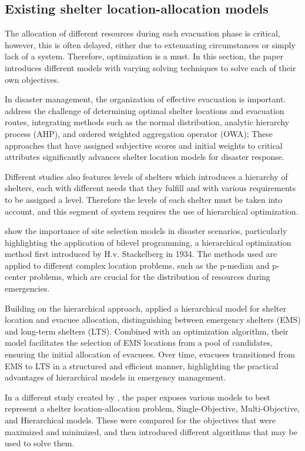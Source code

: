 \subsection{Existing shelter location-allocation models}
	The allocation of different resources during each evacuation phase is critical, however, this is often delayed, either due to extenuating circumstances or simply lack of a system. Therefore, optimization is a must. In this section, the paper introduces different models with varying solving techniques to solve each of their own objectives.
	
	In disaster management, the organization of effective evacuation is important. \textcite{Yiying2022} address the challenge of determining optimal shelter locations and evacuation routes, integrating methods such as the normal distribution, analytic hierarchy process (AHP), and ordered weighted aggregation operator (OWA); These approaches that have assigned subjective scores and initial weights to critical attributes significantly advances shelter location models for disaster response.
	
	Different studies also features levels of shelters which introduces a hierarchy of shelters, each with different needs that they fulfill and with various requirements to be assigned a level. Therefore the levels of each shelter must be taken into account, and this segment of system requires the use of hierarchical optimization.
	
	\textcite{Yunjia2019} show the importance of site selection models in disaster scenarios, particularly highlighting the application of bilevel programming, a hierarchical optimization method first introduced by H.v. Stackelberg in 1934. The methods used are applied to different complex location problems, such as the p-median and p-center problems, which are crucial for the distribution of resources during emergencies. 
	
	Building on the hierarchical approach, \textcite{Xiujuan2019} applied a hierarchical model for shelter location and evacuee allocation, distinguishing between emergency shelters (EMS) and long-term shelters (LTS). Combined with an optimization algorithm, their model facilitates the selection of EMS locations from a pool of candidates, ensuring the initial allocation of evacuees. Over time, evacuees transitioned from EMS to LTS in a structured and efficient manner, highlighting the practical advantages of hierarchical models in emergency management. 
	
	In a different study created by \textcite{Yunjia2019}, the paper exposes various models to best represent a shelter location-allocation problem, Single-Objective, Multi-Objective, and Hierarchical models. These were compared for the objectives that were maximized and minimized, and then introduced different algorithms that may be used to solve them.
	
